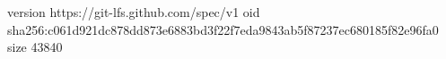 version https://git-lfs.github.com/spec/v1
oid sha256:c061d921dc878dd873e6883bd3f22f7eda9843ab5f87237ec680185f82e96fa0
size 43840
